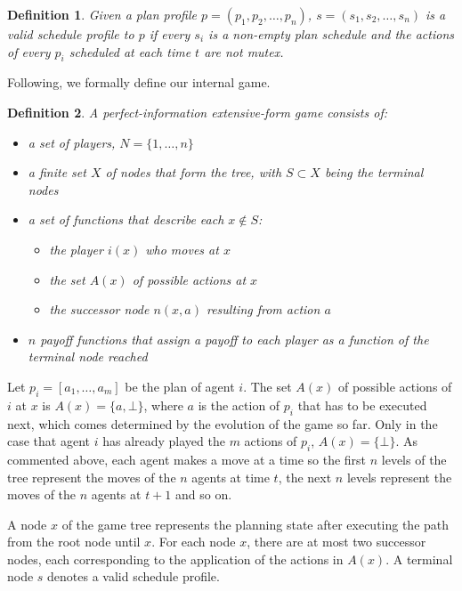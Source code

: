 \documentclass[letterpaper]{article}
\newtheorem{definition}{Definition}
\begin{document}
\begin{definition} Given a plan profile $p=(p_1, p_2, \ldots, p_n)$, $s=(s_1, s_2, \ldots, s_n)$ is a valid schedule profile to $p$
if every $s_i$ is a non-empty plan schedule and the actions of every $p_i$ scheduled at each time $t$ are not mutex.
\end{definition}

Following, we formally define our internal game.



\begin{definition} A perfect-information extensive-form game consists of:
\begin{itemize}
	\item a set of players, $N=\{1, \ldots, n\}$
	\item a finite set $X$ of nodes that form the tree, with $S \subset X$ being the terminal nodes
	\item a set of functions that describe each $x \not\in S$:
        \begin{itemize}
            \item the player $i(x)$ who moves at $x$
            \item the set $A(x)$ of possible actions at $x$
            \item the successor node $n(x,a)$ resulting from action $a$
        \end{itemize}
    \item $n$ payoff functions that assign a payoff to each player as a function of the terminal node reached
\end{itemize}
\end{definition}

Let $p_i=[a_1,\ldots,a_m]$ be the plan of agent $i$. The set $A(x)$ of possible actions of $i$ at $x$ is $A(x)=\{a, \bot\}$, where
$a$ is the action of $p_i$ that has to be executed next, which comes determined by the evolution of the game so far. Only in the case that agent $i$ has already played the $m$ actions of $p_i$, $A(x)=\{\bot\}$. As commented above, each agent makes a move at a time so the first $n$ levels of the tree represent the moves of the $n$ agents at time $t$, the next $n$ levels represent the moves of the $n$ agents at $t+1$ and so on.

A node $x$ of the game tree represents the planning state after executing the path from the root node until $x$. For each node $x$,  there are at most two successor nodes, each corresponding to the application of the actions in $A(x)$. A terminal node $s$ denotes a valid schedule profile.
\end{document}

